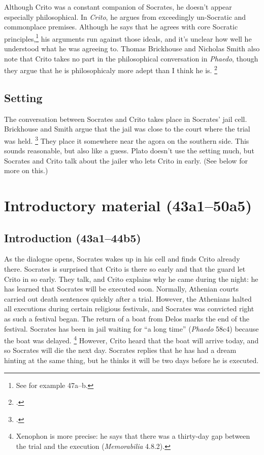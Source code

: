 \documentclass[12pt,letterpaper]{article}
\begin{document}
Although Crito was a constant companion of Socrates, he doesn't appear especially philosophical.
In \textit{Crito}, he argues from exceedingly un-Socratic and commonplace premises.
Although he says that he agrees with core Socratic principles,\footnote{See for example 47a--b.} his arguments run against those ideals, and it's unclear how well he understood what he was agreeing to.
Thomas Brickhouse and Nicholas Smith also note that Crito takes no part in the philosophical conversation in \textit{Phaedo}, though they argue that he is philosophicaly more adept than I think he is.%
\footcite[][196]{brickhouse-smith2004-plato-trial-of-socrates}

\subsection*{Setting}

The conversation between Socrates and Crito takes place in Socrates' jail cell.
Brickhouse and Smith argue that the jail was close to the court where the trial was held.%
\footcite[][197]{brickhouse-smith2004-plato-trial-of-socrates} They place it somewhere near the agora on the southern side.
This sounds reasonable, but also like a guess.
Plato doesn't use the setting much, but Socrates and Crito talk about the jailer who lets Crito in early.
(See below for more on this.)


\section*{Introductory material (43a1--50a5)}

\subsection*{Introduction (43a1--44b5)}

As the dialogue opens, Socrates wakes up in his cell and finds Crito already there.
Socrates is surprised that Crito is there so early and that the guard let Crito in so early.
They talk, and Crito explains why he came during the night: he has learned that Socrates will be executed soon.
Normally, Athenian courts carried out death sentences quickly after a trial.
However, the Athenians halted all executions during certain religious festivals, and Socrates was convicted right as such a festival began.
The return of a boat from Delos marks the end of the festival.
Socrates has been in jail waiting for ``a long time'' (\textit{Phaedo} 58c4) because the boat was delayed.%
\footnote{Xenophon is more precise: he says that there was a thirty-day gap between the trial and the execution (\textit{Memorabilia} 4.8.2).}
However, Crito heard that the boat will arrive today, and so Socrates will die the next day.
Socrates replies that he has had a dream hinting at the same thing, but he thinks it will be two days before he is executed.
\end{document}
